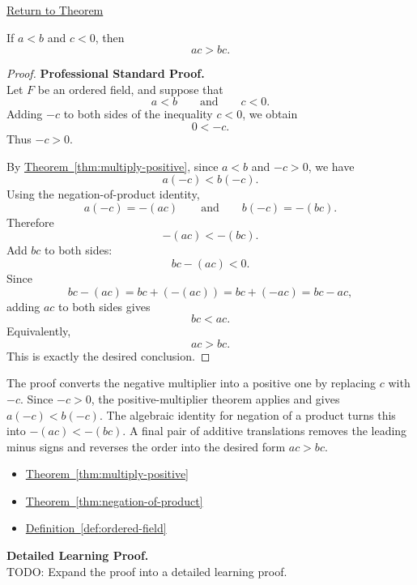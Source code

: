 \newpage
{}
\label{prf:multiply-negative}

\begin{remark*}[Return]
\hyperref[thm:multiply-negative]{Return to Theorem}
\end{remark*}

\begin{theorem*}
If $a<b$ and $c<0$, then
\[
ac>bc.
\]
\end{theorem*}

\begin{proof}
\textbf{Professional Standard Proof.}~\\
Let $F$ be an ordered field, and suppose that
\[
a<b
\qquad\text{and}\qquad
c<0.
\]
Adding $-c$ to both sides of the inequality $c<0$, we obtain
\[
0<-c.
\]
Thus $-c>0$.

By \hyperref[thm:multiply-positive]{Theorem~\ref*{thm:multiply-positive}},
since $a<b$ and $-c>0$, we have
\[
a(-c)<b(-c).
\]
Using the negation-of-product identity,
\[
a(-c)=-(ac)
\qquad\text{and}\qquad
b(-c)=-(bc).
\]
Therefore
\[
-(ac)<-(bc).
\]
Add $bc$ to both sides:
\[
bc-(ac)<0.
\]
Since
\[
bc-(ac)=bc+(-(ac))=bc+(-ac)=bc-ac,
\]
adding $ac$ to both sides gives
\[
bc<ac.
\]
Equivalently,
\[
ac>bc.
\]
This is exactly the desired conclusion.
\end{proof}

\begin{remark*}
The proof converts the negative multiplier into a positive one by replacing
$c$ with $-c$.  Since $-c>0$, the positive-multiplier theorem applies and
gives $a(-c)<b(-c)$.  The algebraic identity for negation of a product turns
this into $-(ac)<-(bc)$.  A final pair of additive translations removes the
leading minus signs and reverses the order into the desired form $ac>bc$.
\end{remark*}

\begin{dependencies}
\begin{itemize}
  \item \hyperref[thm:multiply-positive]{Theorem~\ref*{thm:multiply-positive}}
  \item \hyperref[thm:negation-of-product]{Theorem~\ref*{thm:negation-of-product}}
  \item \hyperref[def:ordered-field]{Definition~\ref*{def:ordered-field}}
\end{itemize}
\end{dependencies}

\textbf{Detailed Learning Proof.}~\\
TODO: Expand the proof into a detailed learning proof.

